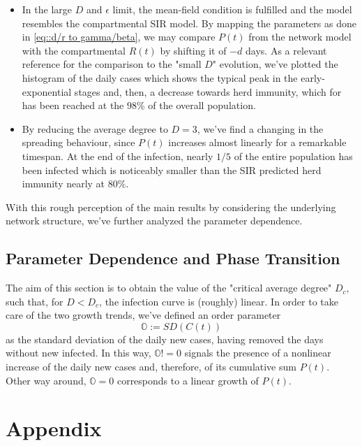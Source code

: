 \documentclass[a4paper,11pt,twoside]{report} %
\begin{document}
\begin{itemize}
    \item In the large $D$ and $\epsilon$ limit, the mean-field condition is fulfilled and the model resembles the compartmental  SIR model. By mapping the parameters as done in \ref{eq::d/r to gamma/beta}, we may compare $P(t)$ from the network model with the compartmental $R(t)$ by shifting it of $-d$ days.
    As a relevant reference for the comparison to the "small $D$" evolution, we've plotted the histogram of the daily cases which shows the typical peak in the early-exponential stages and, then, a decrease towards herd immunity, which for \cite{Thurner22684} has been reached at the $98\%$ of the overall population. 
    \item By reducing the average degree to $D=3$, we've find a changing in the spreading behaviour, since $P(t)$ increases almost linearly for a remarkable timespan. At the end of the infection, nearly $1/5$ of the entire population has been infected which is noticeably smaller than the SIR predicted herd immunity nearly at $80\%$.
\end{itemize}

With this rough perception of the main results by considering the underlying network structure, we've further analyzed the parameter dependence.

\section{Parameter Dependence and Phase Transition}
The aim of this section is to obtain the value of the "critical average degree" $D_c$, such that, for $D<D_c$, the infection curve is (roughly) linear. In order to take care of the two growth trends, we've defined an order parameter 
\begin{equation}
    \label{def::sdc}
    \mathbb{O}:=SD(C(t))
\end{equation}{}
as the standard deviation of the daily new cases, having removed the days without new infected. In this way,     $\mathbb{O}!=0$ signals the presence of a nonlinear increase of the daily new cases and, therefore, of its cumulative sum $P(t)$. Other way around, $\mathbb{O}=0$ corresponds to a linear growth of $P(t)$.




\chapter{Appendix}
\end{document}
